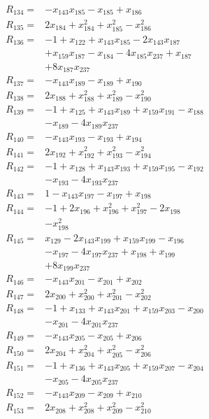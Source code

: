 \begin{align*}
R_{134}={}&-x_{143}x_{185} -x_{185} +x_{186}\\[3pt]
R_{135}={}&2x_{184} +x_{184}^{2} +x_{185}^{2} -x_{186}^{2}\\[3pt]
R_{136}={}&-1 +x_{122} +x_{143}x_{185} -2x_{143}x_{187}\\
&+x_{159}x_{187} -x_{184} -4x_{185}x_{237} +x_{187}\\
&+8x_{187}x_{237}\\[3pt]
R_{137}={}&-x_{143}x_{189} -x_{189} +x_{190}\\[3pt]
R_{138}={}&2x_{188} +x_{188}^{2} +x_{189}^{2} -x_{190}^{2}\\[3pt]
R_{139}={}&-1 +x_{125} +x_{143}x_{189} +x_{159}x_{191} -x_{188}\\
&-x_{189} -4x_{189}x_{237}\\[3pt]
R_{140}={}&-x_{143}x_{193} -x_{193} +x_{194}\\[3pt]
R_{141}={}&2x_{192} +x_{192}^{2} +x_{193}^{2} -x_{194}^{2}\\[3pt]
R_{142}={}&-1 +x_{128} +x_{143}x_{193} +x_{159}x_{195} -x_{192}\\
&-x_{193} -4x_{193}x_{237}\\[3pt]
R_{143}={}&1 -x_{143}x_{197} -x_{197} +x_{198}\\[3pt]
R_{144}={}&-1 +2x_{196} +x_{196}^{2} +x_{197}^{2} -2x_{198}\\
&-x_{198}^{2}\\[3pt]
R_{145}={}&x_{129} -2x_{143}x_{199} +x_{159}x_{199} -x_{196}\\
&-x_{197} -4x_{197}x_{237} +x_{198} +x_{199}\\
&+8x_{199}x_{237}\\[3pt]
R_{146}={}&-x_{143}x_{201} -x_{201} +x_{202}\\[3pt]
R_{147}={}&2x_{200} +x_{200}^{2} +x_{201}^{2} -x_{202}^{2}\\[3pt]
R_{148}={}&-1 +x_{133} +x_{143}x_{201} +x_{159}x_{203} -x_{200}\\
&-x_{201} -4x_{201}x_{237}\\[3pt]
R_{149}={}&-x_{143}x_{205} -x_{205} +x_{206}\\[3pt]
R_{150}={}&2x_{204} +x_{204}^{2} +x_{205}^{2} -x_{206}^{2}\\[3pt]
R_{151}={}&-1 +x_{136} +x_{143}x_{205} +x_{159}x_{207} -x_{204}\\
&-x_{205} -4x_{205}x_{237}\\[3pt]
R_{152}={}&-x_{143}x_{209} -x_{209} +x_{210}\\[3pt]
R_{153}={}&2x_{208} +x_{208}^{2} +x_{209}^{2} -x_{210}^{2}\\[3pt]

\end{align*}
